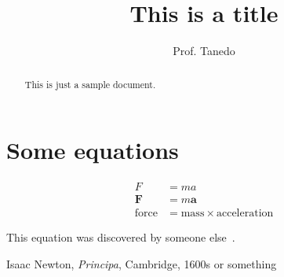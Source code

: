 \documentclass[12pt]{article}
\begin{document}
\title{This is a title}
\author{
    Prof. Tanedo
}

    

\maketitle

\begin{abstract}
    This is just a sample document.
\end{abstract}

\section{Some equations}

\begin{align}
    F &= ma\\
    \mathbf{F} &= m\mathbf{a}\\
    \text{force} &= \text{mass} \times \text{acceleration}
\end{align}

This equation was discovered by someone else~\cite{newton}.


\begin{thebibliography}{9}

  Isaac Newton,
  \textit{Principa},
  Cambridge, 1600s or something

\end{thebibliography}
\end{document}
